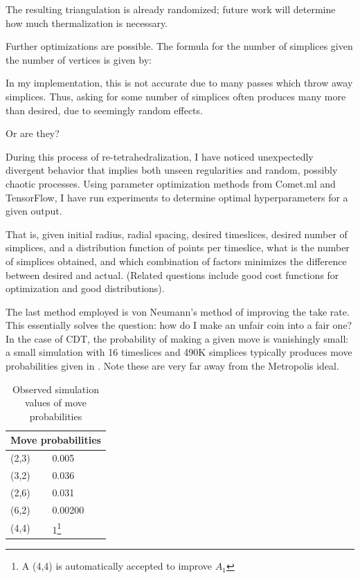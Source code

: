 \documentclass[12pt]{article}
\begin{document}
The resulting triangulation is already randomized; future work will determine how much thermalization is necessary.

Further optimizations are possible. The formula for the number of simplices given the number of vertices is given by:

In my implementation, this is not accurate due to many passes which throw away simplices. Thus, asking for some number of simplices often produces
many more than desired, due to seemingly random effects.

Or are they?

During this process of re-tetrahedralization, I have noticed unexpectedly divergent behavior that implies both unseen
regularities and random, possibly chaotic processes. Using parameter optimization methods from Comet.ml \cite{comet.ml_comet.ml_nodate} and
TensorFlow\cite{noauthor_tensorflow_nodate}, I have run experiments to determine optimal hyperparameters for a given output.

That is, given initial radius, radial spacing, desired timeslices, desired number of simplices, and a distribution function of points per timeslice,
what is the number of simplices obtained, and which combination of factors minimizes the difference between desired and actual. (Related questions
include good cost functions for optimization and good distributions).

The last method employed is von Neumann's method of improving the take rate. This essentially solves the question: how do I make an unfair coin into
a fair one? \cite{mitzenmacher_tossing_nodate} In the case of CDT, the probability of making a given move is vanishingly small: a small simulation with
16 timeslices and 490K simplices typically produces move probabilities given in . Note these are very far away from the Metropolis
ideal.

\begin{table}
\begin{center}
  \begin{tabular}{|l|l|}
    \hline
    \multicolumn{2}{|c|}{Move probabilities} \\
    \hline
    (2,3) & 0.005 \\
    (3,2) & 0.036 \\
    (2,6) & 0.031 \\
    (6,2) & 0.00200 \\
    (4,4) & 1\footnote{A (4,4) is automatically accepted to improve $A_1$}\\
    \hline
    \end{tabular}
  \end{center}
    \caption{Observed simulation values of move probabilities}
    \label{table-moveprob}
  \end{table}
\end{document}
